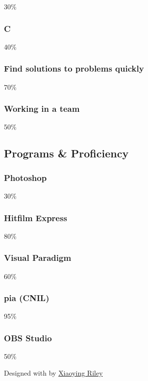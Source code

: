 \documentclass[]{article}
\begin{document}
30\%

\subsubsection{C}\label{c}

40\%

\subsubsection{Find solutions to problems
quickly}\label{find-solutions-to-problems-quickly}

70\%

\subsubsection{Working in a team}\label{working-in-a-team}

50\%

\subsection{\texorpdfstring{{ \emph{} \emph{} } Programs \&
Proficiency}{    Programs \& Proficiency}}\label{programs-proficiency}

\subsubsection{Photoshop}\label{photoshop}

30\%

\subsubsection{Hitfilm Express}\label{hitfilm-express}

80\%

\subsubsection{Visual Paradigm}\label{visual-paradigm}

60\%

\subsubsection{pia (CNIL)}\label{pia-cnil}

95\%

\subsubsection{OBS Studio}\label{obs-studio}

50\%

Designed with \emph{} by \href{http://themes.3rdwavemedia.com}{Xiaoying
Riley}
\end{document}
